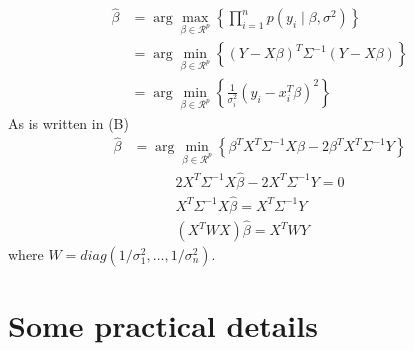\documentclass[11pt]{article}
\begin{document}
\begin{enumerate}[(A)]
\bigskip
\begin{align*}
    \hat{\beta} &= \arg \max_{\beta \in \mathcal{R}^p} \left\{ \prod_{i=1}^n p(y_i \mid \beta, \sigma^2) \right\} \\
    &= \arg \min_{\beta \in \mathcal{R}^p} \left\{ (Y-X\beta)^T\Sigma^{-1}(Y-X\beta) \right\} \\
    &= \arg \min_{\beta \in \mathcal{R}^p} \left\{ \frac{1}{\sigma_i^2} (y_i - x_i^T\beta)^2 \right\}
\end{align*}
As is written in (B)
\begin{align*}
    \hat{\beta} 
    &= \arg \min_{\beta \in \mathcal{R}^p} \left\{ \beta^TX^T\Sigma^{-1}X\beta - 2\beta^TX^T\Sigma^{-1}Y \right\} 
\end{align*}
\begin{align*}
    2X^T\Sigma^{-1}X\hat{\beta} - 2X^T\Sigma^{-1}Y = 0 \\
    X^T\Sigma^{-1}X\hat{\beta} = X^T\Sigma^{-1}Y \\
    (X^T W X) \hat \beta = X^T W Y
\end{align*}
where $W=diag(1/\sigma_1^2, \dots, 1/\sigma_n^2)$.

\end{enumerate}

\section{Some practical details}
\end{document}

